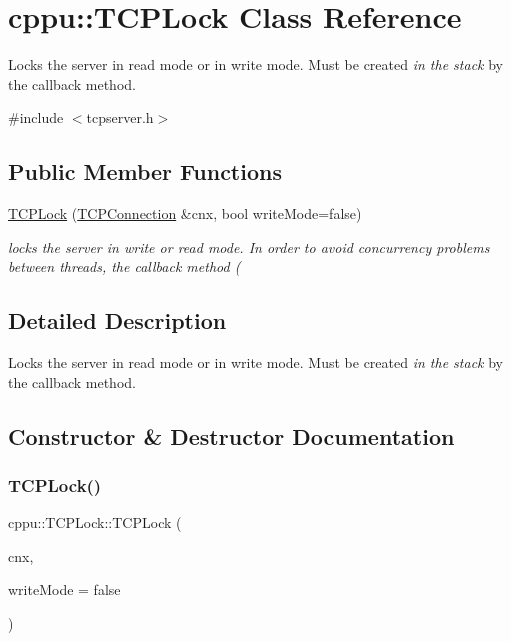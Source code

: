 \hypertarget{classcppu_1_1_t_c_p_lock}{}\section{cppu\+::T\+C\+P\+Lock Class Reference}
\label{classcppu_1_1_t_c_p_lock}


Locks the server in read mode or in write mode. Must be created {\itshape in the stack} by the callback method.  




{\ttfamily \#include $<$tcpserver.\+h$>$}

\subsection*{Public Member Functions}
\begin{DoxyCompactItemize}
\item 
\mbox{\hyperlink{classcppu_1_1_t_c_p_lock_ad9ff8205f334918a69746ef90f731877}{T\+C\+P\+Lock}} (\mbox{\hyperlink{classcppu_1_1_t_c_p_connection}{T\+C\+P\+Connection}} \&cnx, bool write\+Mode=false)
\begin{DoxyCompactList}\small\item\em locks the server in {\itshape write} or {\itshape read} mode. In order to avoid concurrency problems between threads, the callback method ( \end{DoxyCompactList}\end{DoxyCompactItemize}


\subsection{Detailed Description}
Locks the server in read mode or in write mode. Must be created {\itshape in the stack} by the callback method. 

\subsection{Constructor \& Destructor Documentation}
\mbox{\label{classcppu_1_1_t_c_p_lock_ad9ff8205f334918a69746ef90f731877}} 
\subsubsection{\texorpdfstring{TCPLock()}{TCPLock()}}
{\footnotesize\ttfamily cppu\+::\+T\+C\+P\+Lock\+::\+T\+C\+P\+Lock (\begin{DoxyParamCaption}\item[{\mbox{\hyperlink{classcppu_1_1_t_c_p_connection}{T\+C\+P\+Connection}} \&}]{cnx,  }\item[{bool}]{write\+Mode = {\ttfamily false} }\end{DoxyParamCaption})}




